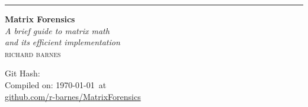 \begin{titlepage} %
  \raggedleft %
  
  \rule{1pt}{\textheight} %
  \hspace{0.05\textwidth} %
  \parbox[b]{0.75\textwidth}{ %
    
    {\Huge\bfseries Matrix Forensics \\[\baselineskip]} %
    {\large\textit{A brief guide to matrix math \\ and its efficient implementation}}\\[4\baselineskip] %
    {\Large\textsc{richard barnes}} %
    \\[4\baselineskip]
    \immediate{}

    Git Hash:  \\
    Compiled on: \today\ at \currenttime
    \\[2\baselineskip]
    \href{https://github.com/r-barnes/MatrixForensics}{github.com/r-barnes/MatrixForensics}
    
    \vspace{0.4\textheight} %
    
  }

\end{titlepage}